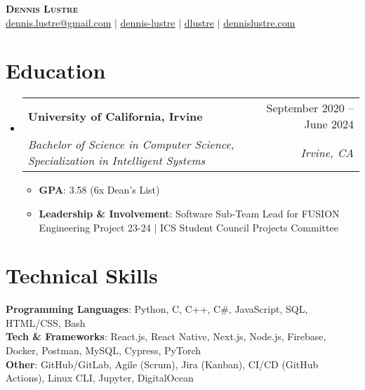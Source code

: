 \documentclass[letterpaper,11pt]{article}
\makeatletter
\newcommand{\resumeItem}[1]{
  \item\setstretch{.95}\small{
    {#1 \vspace{-2pt}}
  }
}
\newcommand{\resumeSubheading}[4]{
  \vspace{-2pt}\item
    \begin{tabular*}{0.97\textwidth}[t]{l@{\extracolsep{\fill}}r}
      \textbf{#1} & #2 \\
      \textit{\small#3} & \textit{\small #4} \\
    \end{tabular*}\vspace{-4.8pt}
}
\newcommand{\resumeSubHeadingListStart}{\begin{itemize}[leftmargin=0.15in, label={}]}
\newcommand{\resumeSubHeadingListEnd}{\end{itemize}}
\newcommand{\resumeItemListStart}{\begin{itemize}}
\newcommand{\resumeItemListEnd}{\end{itemize}\vspace{-5pt}}
\makeatother
\begin{document}
\begin{center}
    \textbf{\Huge \scshape Dennis Lustre} \\ \vspace{1pt}
    \faEnvelope{ }\href{mailto:dennis.lustre@gmail.com}{\uline{dennis.lustre@gmail.com}} $|$ 
    \faLinkedinSquare{ }\href{https://linkedin.com/in/dennis-lustre}{\uline{dennis-lustre}} $|$
    \faGithub{ }\href{https://github.com/dlustre}{\uline{dlustre}} $|$
    \faGlobe{ }\href{https://dennislustre.com}{\uline{dennislustre.com}}
\end{center}


\section{Education}
  \resumeSubHeadingListStart
    \resumeSubheading
      {University of California, Irvine}{September 2020 -- June 2024}
      {Bachelor of Science in Computer Science, Specialization in Intelligent Systems}{Irvine, CA}
    \resumeItemListStart
        \resumeItem{\textbf{GPA}: 3.58 (6x Dean's List)}
        \resumeItem{\textbf{Leadership \& Involvement}: Software Sub-Team Lead for FUSION Engineering Project 23-24 $|$ ICS Student Council Projects Committee}
    \resumeItemListEnd
  \resumeSubHeadingListEnd

\section{Technical Skills}
 \begin{itemize}[leftmargin=0.15in, label={}]
    \small{\item{
     \textbf{Programming Languages}{: Python, C, C++, C\#, JavaScript, SQL, HTML/CSS, Bash} \\
     \textbf{Tech \& Frameworks}{: React.js, React Native, Next.js, Node.js, Firebase, Docker, Postman, MySQL, Cypress, PyTorch} \\
     \textbf{Other}{: GitHub/GitLab, Agile (Scrum), Jira (Kanban), CI/CD (GitHub Actions), Linux CLI, Jupyter, DigitalOcean} \\
    }}
 \end{itemize}
 
\end{document}
